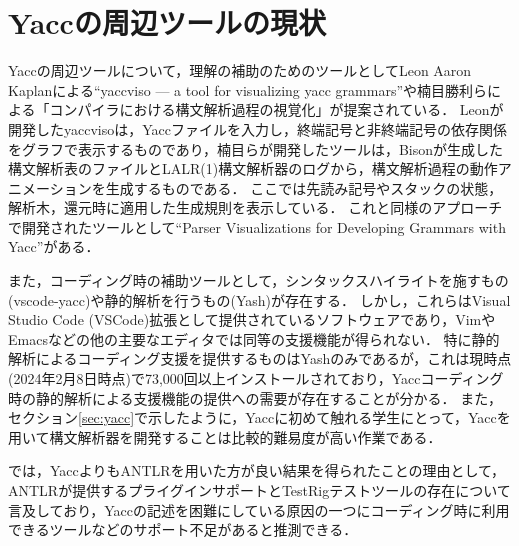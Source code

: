 \documentclass[fontsize=9bp,twocolumn,column_gap=2.36zw,a4paper,report]{jlreq}
\begin{document}
\section{Yaccの周辺ツールの現状}\label{sec:yacc_tools}

Yaccの周辺ツールについて，理解の補助のためのツールとしてLeon Aaron Kaplanによる``yaccviso — a tool for visualizing yacc grammars''\cite{kaplan2006yaccviso}や楠目勝利らによる「コンパイラにおける構文解析過程の視覚化」\cite{楠目勝利1997コンパイラにおける構文解析過程の視覚化}が提案されている．
Leonが開発したyaccvisoは，Yaccファイルを入力し，終端記号と非終端記号の依存関係をグラフで表示するものであり，楠目らが開発したツールは，Bisonが生成した構文解析表のファイルとLALR(1)構文解析器のログから，構文解析過程の動作アニメーションを生成するものである．
ここでは先読み記号やスタックの状態，解析木，還元時に適用した生成規則を表示している．
これと同様のアプローチで開発されたツールとして``Parser Visualizations for Developing Grammars with Yacc''\cite{lovato1995parser}がある．\par
また，コーディング時の補助ツールとして，シンタックスハイライトを施すもの(vscode-yacc\cite{vscode-yacc})や静的解析を行うもの(Yash\cite{yash})が存在する．
しかし，これらはVisual Studio Code (VSCode)拡張として提供されているソフトウェアであり，VimやEmacsなどの他の主要なエディタでは同等の支援機能が得られない．
特に静的解析によるコーディング支援を提供するものはYashのみであるが，これは現時点(2024年2月8日時点)で73,000回以上インストールされており，Yaccコーディング時の静的解析による支援機能の提供への需要が存在することが分かる．
また，セクション\ref{sec:yacc}で示したように，Yaccに初めて触れる学生にとって，Yaccを用いて構文解析器を開発することは比較的難易度が高い作業である．

\begin{figure}[h]
\end{figure}

\cite{lovato1995parser}では，YaccよりもANTLRを用いた方が良い結果を得られたことの理由として，ANTLRが提供するプライグインサポートとTestRigテストツールの存在について言及しており，Yaccの記述を困難にしている原因の一つにコーディング時に利用できるツールなどのサポート不足があると推測できる．
\end{document}
